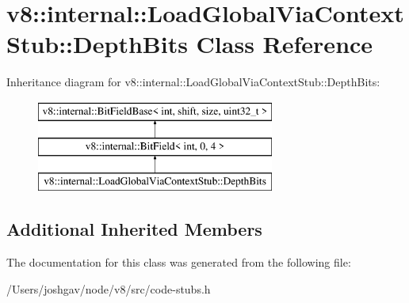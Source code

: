 \hypertarget{classv8_1_1internal_1_1_load_global_via_context_stub_1_1_depth_bits}{}\section{v8\+:\+:internal\+:\+:Load\+Global\+Via\+Context\+Stub\+:\+:Depth\+Bits Class Reference}
\label{classv8_1_1internal_1_1_load_global_via_context_stub_1_1_depth_bits}
Inheritance diagram for v8\+:\+:internal\+:\+:Load\+Global\+Via\+Context\+Stub\+:\+:Depth\+Bits\+:\begin{figure}[H]
\begin{center}
\leavevmode
\includegraphics[height=3.000000cm]{classv8_1_1internal_1_1_load_global_via_context_stub_1_1_depth_bits}
\end{center}
\end{figure}
\subsection*{Additional Inherited Members}


The documentation for this class was generated from the following file\+:\begin{DoxyCompactItemize}
\item 
/\+Users/joshgav/node/v8/src/code-\/stubs.\+h\end{DoxyCompactItemize}
